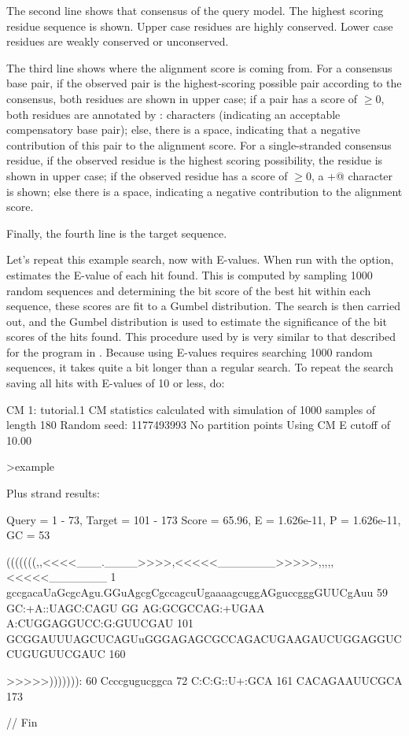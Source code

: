 The second line shows that consensus of the query model. The highest
scoring residue sequence is shown. Upper case residues are highly
conserved. Lower case residues are weakly conserved or unconserved.

The third line shows where the alignment score is coming from. For a
consensus base pair, if the observed pair is the highest-scoring
possible pair according to the consensus, both residues are shown in
upper case; if a pair has a score of $\geq 0$, both residues are
annotated by : characters (indicating an acceptable compensatory base
pair); else, there is a space, indicating that a negative contribution
of this pair to the alignment score. For a single-stranded consensus
residue, if the observed residue is the highest scoring possibility,
the residue is shown in upper case; if the observed residue has a
score of $\geq 0$, a \verb@+@ character is shown; else there is a
space, indicating a negative contribution to the alignment score.

Finally, the fourth line is the target sequence.

Let's repeat this example search, now with E-values. When run with the
 option,  estimates the E-value of each hit
found. This is
computed by sampling 1000 random sequences and determining the bit
score of the best hit within each sequence, these scores are fit to a
Gumbel distribution. The search is then carried out, and the Gumbel
distribution is used to estimate the significance of the bit scores of
the hits found. This procedure used by  is very
similar to that described for the  program in
\cite{KleinEddy03}. Because using E-values requires searching
1000 random sequences, it takes quite a bit longer than a regular
search. To repeat the search saving all hits with E-values of 10 or
less, do:


{\samepage
\begin{sreoutput}
CM 1: tutorial.1
CM statistics calculated with simulation of 1000 samples of length 180
Random seed: 1177493993
No partition points
Using CM E cutoff of 10.00

>example

  Plus strand results:

 Query = 1 - 73, Target = 101 - 173
 Score = 65.96, E = 1.626e-11, P = 1.626e-11, GC =  53

           (((((((,,<<<<___.____>>>>,<<<<<_______>>>>>,,,,,<<<<<_______
         1 gccgacaUaGcgcAgu.GGuAgcgCgccagcuUgaaaagcuggAGguccgggGUUCgAuu 59      
           GC:+A::UAGC:CAGU GG AG:GCGCCAG:+UGAA A:CUGGAGGUCC:G:GUUCGAU 
       101 GCGGAUUUAGCUCAGUuGGGAGAGCGCCAGACUGAAGAUCUGGAGGUCCUGUGUUCGAUC 160     

           >>>>>))))))):
        60 Ccccgugucggca 72      
           C:C:G::U+:GCA
       161 CACAGAAUUCGCA 173     


//
Fin
\end{sreoutput}
}

